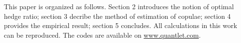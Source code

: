 \documentclass[11pt,a4paper,english]{article}
\begin{document}


This paper is organized as follows. Section 2 introduces the notion of optimal hedge ratio; section 3 decribe the method of estimation of copulae; section 4 provides the empirical result; section 5 concludes.\medskip
All calculations in this work can be reproduced.
The codes are available on \href{http://www.quantlet.com/}{www.quantlet.com}.











\newpage
%

\end{document}

